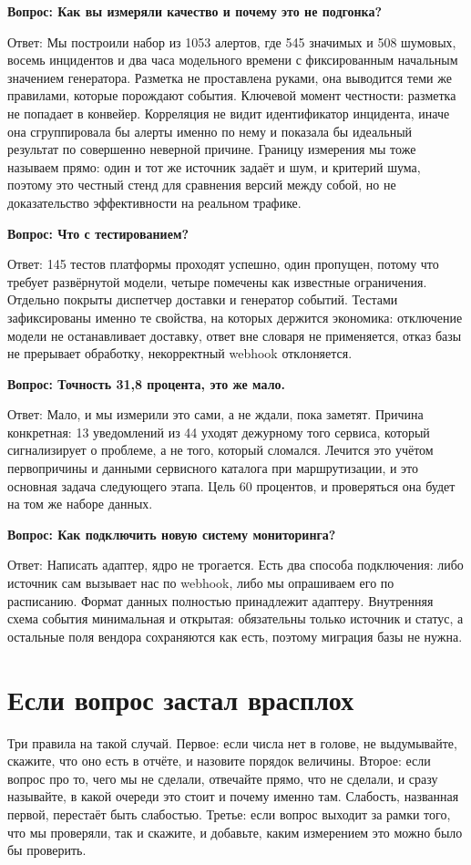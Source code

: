 \documentclass[11pt]{article}
\newcommand{\qa}[2]{%
\par\vspace{7pt}%
{\bfseries Вопрос: #1}\par\vspace{2pt}
{Ответ: #2}\par\vspace{4pt}}
\begin{document}
\qa{Как вы измеряли качество и почему это не подгонка?}
{Мы построили набор из 1053 алертов, где 545 значимых и 508 шумовых, восемь
инцидентов и два часа модельного времени с фиксированным начальным значением
генератора. Разметка не проставлена руками, она выводится теми же правилами,
которые порождают события. Ключевой момент честности: разметка не попадает в
конвейер. Корреляция не видит идентификатор инцидента, иначе она сгруппировала
бы алерты именно по нему и показала бы идеальный результат по совершенно
неверной причине. Границу измерения мы тоже называем прямо: один и тот же
источник задаёт и шум, и критерий шума, поэтому это честный стенд для
сравнения версий между собой, но не доказательство эффективности на реальном
трафике.}

\qa{Что с тестированием?}
{145 тестов платформы проходят успешно, один пропущен, потому что требует
развёрнутой модели, четыре помечены как известные ограничения. Отдельно
покрыты диспетчер доставки и генератор событий. Тестами зафиксированы именно
те свойства, на которых держится экономика: отключение модели не останавливает
доставку, ответ вне словаря не применяется, отказ базы не прерывает обработку,
некорректный webhook отклоняется.}

\qa{Точность 31,8 процента, это же мало.}
{Мало, и мы измерили это сами, а не ждали, пока заметят. Причина конкретная:
13 уведомлений из 44 уходят дежурному того сервиса, который сигнализирует о
проблеме, а не того, который сломался. Лечится это учётом первопричины и
данными сервисного каталога при маршрутизации, и это основная задача
следующего этапа. Цель 60 процентов, и проверяться она будет на том же наборе
данных.}

\qa{Как подключить новую систему мониторинга?}
{Написать адаптер, ядро не трогается. Есть два способа подключения: либо
источник сам вызывает нас по webhook, либо мы опрашиваем его по расписанию.
Формат данных полностью принадлежит адаптеру. Внутренняя схема события
минимальная и открытая: обязательны только источник и статус, а остальные поля
вендора сохраняются как есть, поэтому миграция базы не нужна.}

\section{Если вопрос застал врасплох}

\colorbox{tipbg}{\parbox{\dimexpr\textwidth-2\fboxsep}{%
Три правила на такой случай. Первое: если числа нет в голове, не выдумывайте,
скажите, что оно есть в отчёте, и назовите порядок величины. Второе: если
вопрос про то, чего мы не сделали, отвечайте прямо, что не сделали, и сразу
называйте, в какой очереди это стоит и почему именно там. Слабость,
названная первой, перестаёт быть слабостью. Третье: если вопрос выходит за
рамки того, что мы проверяли, так и скажите, и добавьте, каким измерением это
можно было бы проверить.}}
\end{document}
